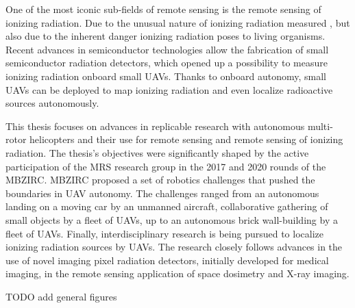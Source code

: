 \documentclass[a4paper,11pt,titlepage,twoside]{book}
\newcommand{\todo}[1]{{\color{red} TODO {#1}}}
\begin{document}
One of the most iconic sub-fields of remote sensing is the remote sensing of ionizing radiation.
Due to the unusual nature of ionizing radiation measured \cite{andreo2017fundamentals}, but also due to the inherent danger ionizing radiation poses to living organisms.
Recent advances in semiconductor technologies allow the fabrication of small semiconductor radiation detectors, which opened up a possibility to measure ionizing radiation onboard small \acp{UAV}.
Thanks to onboard autonomy, small \acp{UAV} can be deployed to map ionizing radiation and even localize radioactive sources autonomously.

This thesis focuses on advances in replicable research with autonomous multi-rotor helicopters and their use for remote sensing and remote sensing of ionizing radiation.
The thesis's objectives were significantly shaped by the active participation of the \ac{MRS} research group in the 2017 and 2020 rounds of the \ac{MBZIRC}.
MBZIRC proposed a set of robotics challenges that pushed the boundaries in \ac{UAV} autonomy.
The challenges ranged from an autonomous landing on a moving car by an unmanned aircraft, collaborative gathering of small objects by a fleet of \acp{UAV}, up to an autonomous brick wall-building by a fleet of \acp{UAV}.
Finally, interdisciplinary research is being pursued to localize ionizing radiation sources by \acp{UAV}.
The research closely follows advances in the use of novel imaging pixel radiation detectors, initially developed for medical imaging, in the remote sensing application of space dosimetry and X-ray imaging.

\todo{add general figures}
\end{document}

